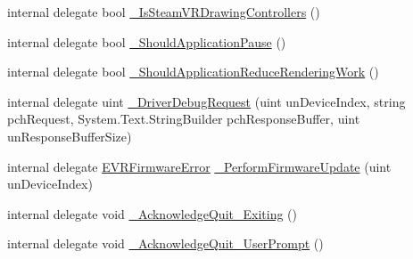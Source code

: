 \begin{DoxyCompactItemize}
\item 
internal delegate bool \mbox{\hyperlink{struct_valve_1_1_v_r_1_1_i_v_r_system_a160c811798537299b253f20e8bcc1e4d}{\+\_\+\+Is\+Steam\+V\+R\+Drawing\+Controllers}} ()
\item 
internal delegate bool \mbox{\hyperlink{struct_valve_1_1_v_r_1_1_i_v_r_system_ad63c0ab21538f30ce52420c007356f12}{\+\_\+\+Should\+Application\+Pause}} ()
\item 
internal delegate bool \mbox{\hyperlink{struct_valve_1_1_v_r_1_1_i_v_r_system_a6f55813bd7702e935e3313a50f27fd87}{\+\_\+\+Should\+Application\+Reduce\+Rendering\+Work}} ()
\item 
internal delegate uint \mbox{\hyperlink{struct_valve_1_1_v_r_1_1_i_v_r_system_a818e951800bb68fb2ae856f7f12dd2fe}{\+\_\+\+Driver\+Debug\+Request}} (uint un\+Device\+Index, string pch\+Request, System.\+Text.\+String\+Builder pch\+Response\+Buffer, uint un\+Response\+Buffer\+Size)
\item 
internal delegate \mbox{\hyperlink{namespace_valve_1_1_v_r_a07c3927041d6bb490e61ca27612c41ff}{E\+V\+R\+Firmware\+Error}} \mbox{\hyperlink{struct_valve_1_1_v_r_1_1_i_v_r_system_ab19faf642558ef1a557fb70618db9ba3}{\+\_\+\+Perform\+Firmware\+Update}} (uint un\+Device\+Index)
\item 
internal delegate void \mbox{\hyperlink{struct_valve_1_1_v_r_1_1_i_v_r_system_aa692c4d5b5097052364afcb966fd63cd}{\+\_\+\+Acknowledge\+Quit\+\_\+\+Exiting}} ()
\item 
internal delegate void \mbox{\hyperlink{struct_valve_1_1_v_r_1_1_i_v_r_system_a4309327757a4f929aeb20c09f12f16b4}{\+\_\+\+Acknowledge\+Quit\+\_\+\+User\+Prompt}} ()
\end{DoxyCompactItemize}
